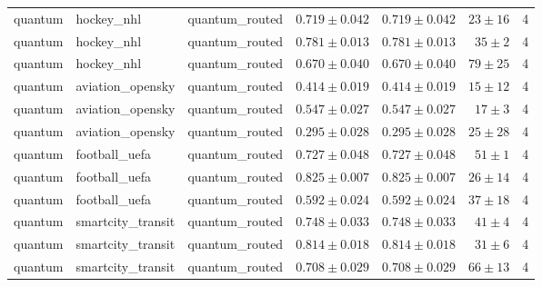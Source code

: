 \begin{table}[htbp]
\begin{tabular}{l l l r r r r}
quantum & hockey\_nhl & quantum\_routed & $0.719\pm0.042$ & $0.719\pm0.042$ & $23\pm16$ & 4 \\
quantum & hockey\_nhl & quantum\_routed & $0.781\pm0.013$ & $0.781\pm0.013$ & $35\pm2$ & 4 \\
quantum & hockey\_nhl & quantum\_routed & $0.670\pm0.040$ & $0.670\pm0.040$ & $79\pm25$ & 4 \\
quantum & aviation\_opensky & quantum\_routed & $0.414\pm0.019$ & $0.414\pm0.019$ & $15\pm12$ & 4 \\
quantum & aviation\_opensky & quantum\_routed & $0.547\pm0.027$ & $0.547\pm0.027$ & $17\pm3$ & 4 \\
quantum & aviation\_opensky & quantum\_routed & $0.295\pm0.028$ & $0.295\pm0.028$ & $25\pm28$ & 4 \\
quantum & football\_uefa & quantum\_routed & $0.727\pm0.048$ & $0.727\pm0.048$ & $51\pm1$ & 4 \\
quantum & football\_uefa & quantum\_routed & $0.825\pm0.007$ & $0.825\pm0.007$ & $26\pm14$ & 4 \\
quantum & football\_uefa & quantum\_routed & $0.592\pm0.024$ & $0.592\pm0.024$ & $37\pm18$ & 4 \\
quantum & smartcity\_transit & quantum\_routed & $0.748\pm0.033$ & $0.748\pm0.033$ & $41\pm4$ & 4 \\
quantum & smartcity\_transit & quantum\_routed & $0.814\pm0.018$ & $0.814\pm0.018$ & $31\pm6$ & 4 \\
quantum & smartcity\_transit & quantum\_routed & $0.708\pm0.029$ & $0.708\pm0.029$ & $66\pm13$ & 4 \\
\hline
\end{tabular}
\end{table}
